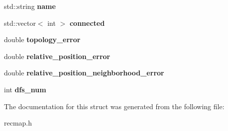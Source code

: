 \begin{DoxyCompactItemize}
\item 
\hypertarget{structcrecmap_1_1map__region_aab1330fcd69e4a86a748eee70fdd51c2}{std\+::string {\bfseries name}}\label{structcrecmap_1_1map__region_aab1330fcd69e4a86a748eee70fdd51c2}

\item 
\hypertarget{structcrecmap_1_1map__region_aa1917d7aa0720c507f260374f11516fe}{std\+::vector$<$ int $>$ {\bfseries connected}}\label{structcrecmap_1_1map__region_aa1917d7aa0720c507f260374f11516fe}

\item 
\hypertarget{structcrecmap_1_1map__region_a9023cf4658ce2f21290b62c2e2ee9401}{double {\bfseries topology\+\_\+error}}\label{structcrecmap_1_1map__region_a9023cf4658ce2f21290b62c2e2ee9401}

\item 
\hypertarget{structcrecmap_1_1map__region_a83e9ccaa7694718d4dfa6c8c2f2593ef}{double {\bfseries relative\+\_\+position\+\_\+error}}\label{structcrecmap_1_1map__region_a83e9ccaa7694718d4dfa6c8c2f2593ef}

\item 
\hypertarget{structcrecmap_1_1map__region_aed781775ed47c4af24b3c2a76f232f46}{double {\bfseries relative\+\_\+position\+\_\+neighborhood\+\_\+error}}\label{structcrecmap_1_1map__region_aed781775ed47c4af24b3c2a76f232f46}

\item 
\hypertarget{structcrecmap_1_1map__region_a80f4d9d2679093cc81fac7a0bbc8c2b2}{int {\bfseries dfs\+\_\+num}}\label{structcrecmap_1_1map__region_a80f4d9d2679093cc81fac7a0bbc8c2b2}

\end{DoxyCompactItemize}


The documentation for this struct was generated from the following file\+:\begin{DoxyCompactItemize}
\item 
recmap.\+h\end{DoxyCompactItemize}
